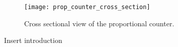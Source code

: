 \begin{figure}[!h]
  \centering
  \texttt{[image: prop\_counter\_cross\_section]}
    \caption{Cross sectional view of the proportional counter.}
  \label{fig:prop_count_cs}
\end{figure}
Insert introduction

